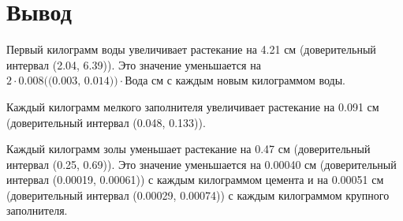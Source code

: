 \documentclass[10pt]{article}
\begin{document}
\section{Вывод}

Первый килограмм воды увеличивает растекание на 4.21 см (доверительный интервал (2.04, 6.39)).
Это значение уменьшается на $2 \cdot 0.008 \text{((0.003, 0.014))} \cdot \text{Вода}$ см с каждым новым килограммом воды.

Каждый килограмм мелкого заполнителя увеличивает растекание на 0.091 см (доверительный интервал (0.048, 0.133)).

Каждый килограмм золы уменьшает растекание на 0.47 см (доверительный интервал (0.25, 0.69)).
Это значение уменьшается на 0.00040 см (доверительный интервал (0.00019, 0.00061)) с каждым килограммом цемента и на 0.00051 см (доверительный интервал (0.00029, 0.00074)) с каждым килограммом крупного заполнителя.
\end{document}
